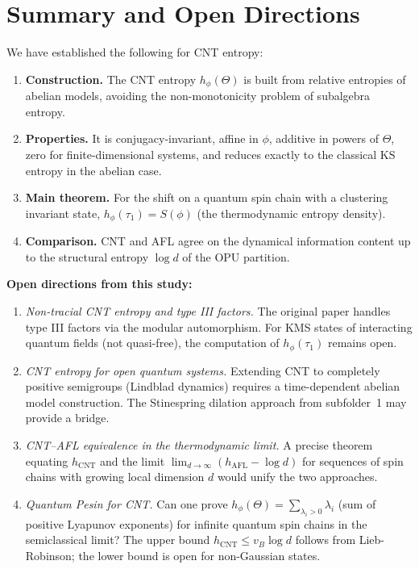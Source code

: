 \documentclass[12pt,a4paper]{article}
\newcommand{\thetaaut}{\Theta}
\begin{document}
\section{Summary and Open Directions}
\label{sec:summary}

We have established the following for CNT entropy:

\begin{enumerate}
\item \textbf{Construction.}  The CNT entropy $h_\phi(\thetaaut)$ is built from relative
  entropies of abelian models, avoiding the non-monotonicity problem of subalgebra entropy.
\item \textbf{Properties.}  It is conjugacy-invariant, affine in $\phi$, additive in
  powers of $\thetaaut$, zero for finite-dimensional systems, and reduces exactly to
  the classical KS entropy in the abelian case.
\item \textbf{Main theorem.}  For the shift on a quantum spin chain with a clustering
  invariant state, $h_\phi(\tau_1)=S(\phi)$ (the thermodynamic entropy density).
\item \textbf{Comparison.}  CNT and AFL agree on the dynamical information content
  up to the structural entropy $\log d$ of the OPU partition.
\end{enumerate}

\medskip\noindent\textbf{Open directions from this study:}
\begin{enumerate}
\item \emph{Non-tracial CNT entropy and type III factors.}
  The original paper \cite{cnt87} handles type III factors via the modular automorphism.
  For KMS states of interacting quantum fields (not quasi-free), the computation of
  $h_\phi(\tau_1)$ remains open.
\item \emph{CNT entropy for open quantum systems.}
  Extending CNT to completely positive semigroups (Lindblad dynamics) requires
  a time-dependent abelian model construction.  The Stinespring dilation approach
  from subfolder~1 may provide a bridge.
\item \emph{CNT--AFL equivalence in the thermodynamic limit.}
  A precise theorem equating $h_\mathrm{CNT}$ and the limit $\lim_{d\to\infty}(h_\mathrm{AFL}-\log d)$
  for sequences of spin chains with growing local dimension $d$ would unify the two approaches.
\item \emph{Quantum Pesin for CNT.}
  Can one prove $h_\phi(\thetaaut)=\sum_{\lambda_i>0}\lambda_i$ (sum of positive Lyapunov
  exponents) for infinite quantum spin chains in the semiclassical limit?
  The upper bound $h_\mathrm{CNT}\le v_B\log d$ follows from Lieb-Robinson;
  the lower bound is open for non-Gaussian states.
\end{enumerate}
\end{document}
